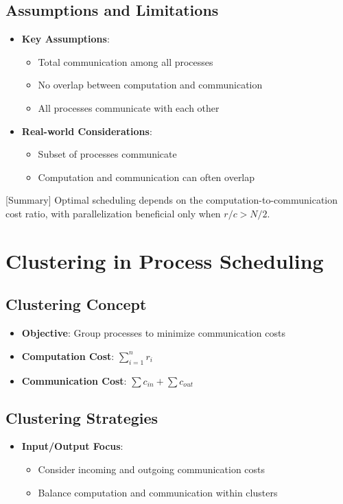 \documentclass[12pt]{article}
\begin{document}
\subsection{Assumptions and Limitations}
\begin{itemize}
\item \textbf{Key Assumptions}:
  \begin{itemize}
  \item Total communication among all processes
  \item No overlap between computation and communication
  \item All processes communicate with each other
  \end{itemize}
  
\item \textbf{Real-world Considerations}:
  \begin{itemize}
  \item Subset of processes communicate
  \item Computation and communication can often overlap
  \end{itemize}
\end{itemize}

[Summary] Optimal scheduling depends on the computation-to-communication cost ratio, with parallelization beneficial only when $r/c > N/2$.

\section{Clustering in Process Scheduling}

\subsection{Clustering Concept}
\begin{itemize}
\item \textbf{Objective}: Group processes to minimize communication costs
\item \textbf{Computation Cost}: $\sum_{i=1}^n r_i$
\item \textbf{Communication Cost}: $\sum c_{in} + \sum c_{out}$
\end{itemize}

\subsection{Clustering Strategies}
\begin{itemize}
\item \textbf{Input/Output Focus}:
  \begin{itemize}
  \item Consider incoming and outgoing communication costs
  \item Balance computation and communication within clusters
  \end{itemize}
\end{itemize}
\end{document}
